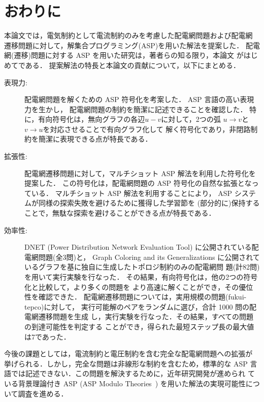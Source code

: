 ﻿\section{おわりに}\label{chap:conc}

本論文では，電気制約として電流制約のみを考慮した配電網問題および配電網
遷移問題に対して，解集合プログラミング(ASP)を用いた解法を提案した．
配電網(遷移)問題に対する ASP を用いた研究は，著者らの知る限り，本論文
がはじめてである．
提案解法の特長と本論文の貢献について，以下にまとめる．

\begin{description}
\item[表現力:]
  配電網問題を解くための ASP 符号化を考案した．
  ASP 言語の高い表現力を生かし，
  配電網問題の制約を簡潔に記述できることを確認した．
  特に，有向符号化は，無向グラフの各辺$u-v$に対して，2つの弧
  $u\rightarrow v$と$v\rightarrow u$を対応させることで有向グラフ化して
  解く符号化であり，非閉路制約を簡潔に表現できる点が特長である．
\item[拡張性:]
  配電網遷移問題に対して，マルチショット ASP 解法を利用した符号化を提案した．
  この符号化は，配電網問題の ASP 符号化の自然な拡張となっている．
  マルチショット ASP 解法を利用することにより，
  ASP システムが同様の探索失敗を避けるために獲得した学習節を
  (部分的に)保持することで，無駄な探索を避けることができる点が特長である．
\item[効率性:]
  DNET (Power Distribution Network Evaluation Tool)
  に公開されている配電網問題(全3問)と，
  Graph Coloring and its Generalizations
  に公開されているグラフを基に独自に生成したトポロジ制約のみの配電網問
  題(計82問)を用いて実行実験を行なった．
  その結果，有向符号化は，他の2つの符号化と比較して，より多くの問題を
  より高速に解くことができ，その優位性を確認できた．
  配電網遷移問題については，実用規模の問題({\sf fukui-tepco})に対して，
  実行可能解のペアをランダムに選び，合計 1000 問の配電網遷移問題を生成
  し，実行実験を行なった．その結果，すべての問題の到達可能性を判定する
  ことができ，得られた最短ステップ長の最大値は7であった．
\end{description}

今後の課題としては，電流制約と電圧制約を含む完全な配電網問題への拡張が
挙げられる．しかし，完全な問題は非線形な制約を含むため，標準的な ASP
言語では記述できない．この問題を解決するために，近年研究開発が進められ
ている背景理論付き ASP (ASP Modulo Theories~\cite{DBLP:conf/iclp/GebserKKOSW16}) 
を用いた解法の実現可能性について調査を進める．

